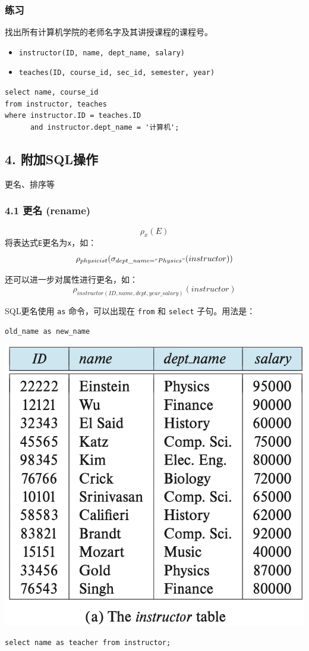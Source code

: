\documentclass[aspectratio=169, 14pt]{beamer}
\begin{document}
\begin{frame}[fragile]
	\frametitle{练习}
	{\large {}} 找出所有计算机学院的老师名字及其讲授课程的课程号。

	\begin{itemize}
		\item \texttt{instructor(ID, name, dept\_name, salary)}
		\item \texttt{teaches(ID, course\_id, sec\_id, semester, year)}
	\end{itemize}
	\pause
	\begin{verbatim} 
select name, course_id
from instructor, teaches
where instructor.ID = teaches.ID 
      and instructor.dept_name = '计算机';
    \end{verbatim}
\end{frame}
\begin{frame}
	\section{\textcolor{darkmidnightblue}{4. 附加SQL操作}}
	更名、排序等
\end{frame}
\begin{frame}
	\frametitle{4.1 更名 (rename)}
	{\large \[\rho_x(E)\]}
	将表达式\texttt{E}更名为\texttt{x}，如：\[\rho_{physicist}(\sigma_{dept\_name=``Physics"}(instructor))\]

	还可以进一步对属性进行更名，如：\[\rho_{instructor(ID, name, dept, year\_salary)}(instructor)\]

\end{frame}

\begin{frame}[fragile]
	SQL更名使用 \texttt{as} 命令，可以出现在 \texttt{from} 和 \texttt{select} 子句。用法是：
	\begin{verbatim}
old_name as new_name    
\end{verbatim}

	\includegraphics[width=.6\textwidth,trim={0cm 8.5cm 0cm 0cm},clip]{table/instructor}

	\begin{verbatim} 
select name as teacher from instructor;
\end{verbatim}

\end{frame}
\end{document}
